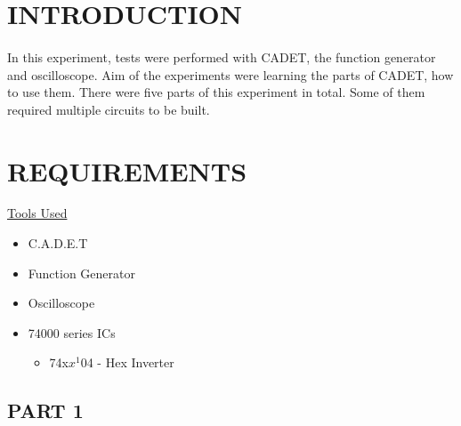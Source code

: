 \documentclass[pdftex,12pt,a4paper]{article}
\begin{document}
\setcounter{page}{1}
\section{INTRODUCTION }

\begin{flushleft}
\paragraph{}
In this experiment, tests were performed with CADET, the function generator and oscilloscope. Aim of the experiments were learning the parts of CADET, how to use them. There were five parts of this experiment in total. Some of them required multiple circuits to be built.
\end{flushleft}
\section{REQUIREMENTS }

\begin{flushleft}
\underline{Tools Used}\cite{booklet}
\end{flushleft}
\begin{itemize}
    \item C.A.D.E.T
    \item Function Generator
    \item Oscilloscope
    \item 74000 series ICs
    \begin{itemize}
        \item 74x$x^{1}$04 - Hex Inverter
    \end{itemize}
\end{itemize}

\begin{flushleft}
\subsection{PART 1}
\end{flushleft}
\end{document}

